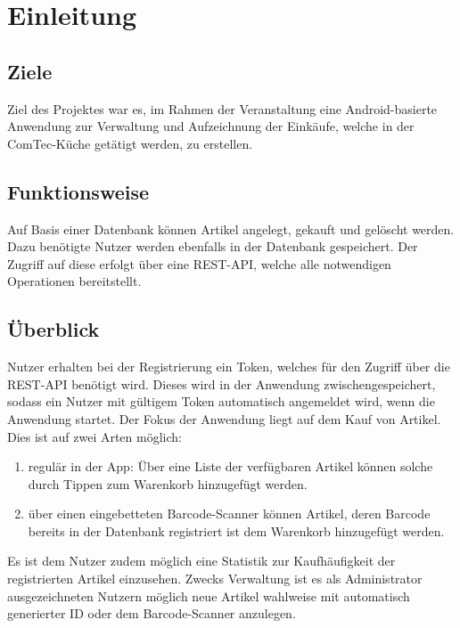 \section{Einleitung}\label{sec:einleitung}

\subsection{Ziele}\label{subsec:ziele}

Ziel des Projektes war es, im Rahmen der Veranstaltung  eine Android-basierte Anwendung zur Verwaltung und Aufzeichnung der Einkäufe, welche in der ComTec-Küche getätigt werden, zu erstellen.

\subsection{Funktionsweise}\label{subsec:funktionsweise}

Auf Basis einer Datenbank können Artikel angelegt, gekauft und gelöscht werden.
Dazu benötigte Nutzer werden ebenfalls in der Datenbank gespeichert.
Der Zugriff auf diese erfolgt über eine REST-API, welche alle notwendigen Operationen bereitstellt.

\subsection{Überblick}\label{subsec:überblick}

Nutzer erhalten bei der Registrierung ein Token, welches für den Zugriff über die REST-API benötigt wird.
Dieses wird in der Anwendung zwischengespeichert, sodass ein Nutzer mit gültigem Token automatisch angemeldet wird, wenn die Anwendung startet.
Der Fokus der Anwendung liegt auf dem Kauf von Artikel.
Dies ist auf zwei Arten möglich:

\begin{enumerate}
	\item regulär in der App: Über eine Liste der verfügbaren Artikel können solche durch Tippen zum Warenkorb hinzugefügt werden.

	\item über einen eingebetteten Barcode-Scanner können Artikel, deren Barcode bereits in der Datenbank registriert ist dem Warenkorb hinzugefügt werden.
\end{enumerate}

Es ist dem Nutzer zudem möglich eine Statistik zur Kaufhäufigkeit der registrierten Artikel einzusehen.
Zwecks Verwaltung ist es als Administrator ausgezeichneten Nutzern möglich neue Artikel wahlweise mit automatisch generierter ID oder dem Barcode-Scanner anzulegen.

